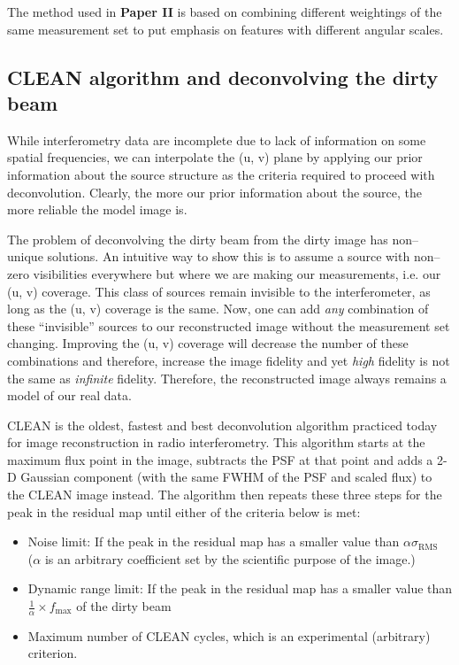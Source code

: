 \documentclass[a4wide,12pt]{book}
\begin{document}
{The method used in {\bf Paper II} is based on combining different weightings of the same measurement set to put emphasis on features with different angular scales. 

\subsection*{CLEAN algorithm and deconvolving the dirty beam}
\label{sec:CLEAN}
While interferometry data are incomplete due to lack of information on some spatial frequencies, we can interpolate the (u, v) plane by applying our prior information about the source structure as the criteria required to proceed with deconvolution. Clearly, the more our prior information about the source, the more reliable the model image is.

The problem of deconvolving the dirty beam from the dirty image has non--unique solutions. An intuitive way to show this is to assume a source with non--zero visibilities everywhere but where we are making our measurements, i.e. our (u, v) coverage. This class of sources remain invisible to the interferometer, as long as the (u, v) coverage is the same. Now, one can add \emph{any} combination of these ``invisible'' sources to our reconstructed image without the measurement set changing. Improving the (u, v) coverage will decrease the number of these combinations and therefore, increase the image fidelity and yet \emph{high} fidelity is not the same as \emph{infinite} fidelity. Therefore, the reconstructed image always remains a model of our real data.

CLEAN \citep[][]{Hogbom1974} is the oldest, fastest and best deconvolution algorithm practiced today for image reconstruction in radio interferometry. This algorithm starts at the maximum flux point in the image, subtracts the PSF at that point and adds a 2-D Gaussian component (with the same FWHM of the PSF and scaled flux) to the CLEAN image instead. The algorithm then repeats these three steps for the peak in the residual map until either of the criteria below is met: 
\begin{itemize}
\item Noise limit: If the peak in the residual map has a smaller value than $\alpha \sigma_\mathrm{RMS}$
\\($\alpha$ is an arbitrary coefficient set by the scientific purpose of the image.)
\item Dynamic range limit: If the peak in the residual map has a smaller value than $\frac{1}{\alpha} \times f_\mathrm{max}$ of the dirty beam
\item Maximum number of CLEAN cycles, which is an experimental (arbitrary) criterion.
\end{itemize}

}
\end{document}
